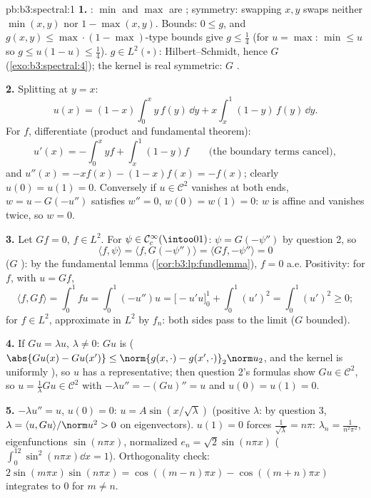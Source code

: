 \begin{solution}{pb:b3:spectral:1}
\textbf{1.} : $\min$ and $\max$ are ;
symmetry: swapping $x, y$ swaps neither $\min(x,y)$ nor $1 -
\max(x,y)$. Bounds: $0 \leq g$, and $g(x,y) \leq
\max\cdot(1-\max)$-type bounds give $g \leq \frac14$ (for $u
= \max$: $\min \leq u$ so $g \leq u(1-u) \leq \frac14$). $g
\in L^2(\square)$: Hilbert--Schmidt, hence $G$ 
(\cref{exo:b3:spectral:4}); the kernel is real symmetric: $G$
.

\textbf{2.} Splitting at $y = x$:
\[
u(x) = (1 - x)\int_0^x y\,f(y)\,\dd y +
x\int_x^1(1 - y)\,f(y)\,\dd y .
\]
For  $f$, differentiate (product and fundamental
theorem):
\[
u'(x) = -\int_0^xyf + \int_x^1(1-y)f
\qquad\text{(the boundary terms cancel)},
\]
and $u''(x) = -xf(x) - (1 - x)f(x) = -f(x)$; clearly $u(0) =
u(1) = 0$. Conversely if $u \in \mathcal C^2$ vanishes at both
ends, $w = u - G(-u'')$ satisfies $w'' = 0$, $w(0) = w(1) =
0$: $w$ is affine and vanishes twice, so $w = 0$.

\textbf{3.} Let $Gf = 0$, $f \in L^2$. For $\psi \in \mathcal
C_c^\infty(\intoo01)$: $\psi = G(-\psi'')$ by question 2, so
\[
\langle f, \psi\rangle = \langle f, G(-\psi'')\rangle
= \langle Gf, -\psi''\rangle = 0
\]
($G$ ): by the fundamental lemma
(\cref{cor:b3:lp:fundlemma}), $f = 0$ a.e. Positivity: for
 $f$, with $u = Gf$,
\[
\langle f, Gf\rangle = \int_0^1 fu = \int_0^1(-u'')u
= \bigl[-u'u\bigr]_0^1 + \int_0^1(u')^2 = \int_0^1(u')^2
\geq 0 ;
\]
for $f \in L^2$, approximate in $L^2$ by  $f_n$:
both sides pass to the limit ($G$ bounded).

\textbf{4.} If $Gu = \lambda u$, $\lambda \neq 0$: $Gu$ is
 ($\abs{Gu(x) - Gu(x')} \leq \norm{g(x,\cdot) -
g(x',\cdot)}_2\norm u_2$, and the kernel is uniformly
), so $u$ has a  representative; then
question 2's formulas show $Gu \in \mathcal C^2$, so $u =
\frac1\lambda Gu \in \mathcal C^2$ with $-\lambda u'' =
-(Gu)'' = u$ and $u(0) = u(1) = 0$.

\textbf{5.} $-\lambda u'' = u$, $u(0) = 0$: $u = A\sin(x/\sqrt
\lambda)$ (positive $\lambda$: by question 3, $\lambda =
\langle u, Gu\rangle/\norm u^2 > 0$ on eigenvectors). $u(1) =
0$ forces $\frac1{\sqrt\lambda} = n\pi$: $\lambda_n =
\frac1{n^2\pi^2}$, eigenfunctions $\sin(n\pi x)$, normalized
$e_n = \sqrt2\sin(n\pi x)$ ($\int_0^12\sin^2(n\pi x)\dd x =
1$). Orthogonality check: $2\sin(m\pi x)\sin(n\pi x) =
\cos((m-n)\pi x) - \cos((m+n)\pi x)$ integrates to $0$ for $m
\neq n$.


\end{solution}
